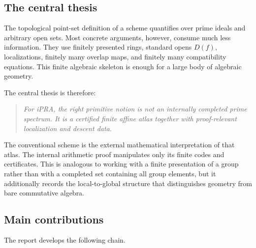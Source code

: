 \subsection{The central thesis}

The topological point-set definition of a scheme quantifies over prime ideals and arbitrary open
sets.  Most concrete arguments, however, consume much less information.  They use finitely
presented rings, standard opens $D(f)$, localizations, finitely many overlap maps, and finitely many
compatibility equations.  This finite algebraic skeleton is enough for a large body of algebraic
geometry.

The central thesis is therefore:

\begin{quote}
\emph{For iPRA, the right primitive notion is not an internally completed prime spectrum.  It is a
certified finite affine atlas together with proof-relevant localization and descent data.}
\end{quote}

The conventional scheme is the external mathematical interpretation of that atlas.  The internal
arithmetic proof manipulates only its finite codes and certificates.  This is analogous to working
with a finite presentation of a group rather than with a completed set containing all group
elements, but it additionally records the local-to-global structure that distinguishes geometry
from bare commutative algebra.

\subsection{Main contributions}

The report develops the following chain.

